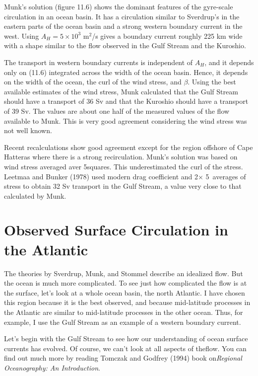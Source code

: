 Munk's solution (figure 11.6) shows the dominant features of the
gyre-scale circulation in an ocean basin. It has a circulation similar
to Sverdrup's in the eastern parts of the ocean basin and a strong
western boundary current in the west. Using $A_H = 5 \times 10^{3}$
m$^2$/s gives a boundary current roughly 225 km wide with a shape
similar to the flow observed in the Gulf Stream and the
Kuroshio.

The transport in western boundary currents is independent of $A_H$, and it depends only on
(11.6) integrated across the width of the ocean basin. Hence, it
depends on the width of the ocean, the curl of the wind
stress, and $\beta$. Using the best
available estimates of the wind stress, Munk calculated that the Gulf
Stream
should have a transport of 36 Sv and that the
Kuroshio should have a transport of 39
Sv. The values are about one half of the measured values of the flow
available to Munk. This is very good agreement considering the wind
stress was not well known.

Recent recalculations show good agreement except for the region
offshore of Cape Hatteras where there is a strong
recirculation. Munk's solution was based on wind stress averaged aver 5\degrees squares. This underestimated the
curl of the stress. Leetmaa and Bunker (1978) used modern drag
coefficient and 2\degrees $\times$
5\degrees\ averages of stress to obtain 32 Sv transport in the Gulf
Stream, a value very close to that
calculated by Munk.

\section{Observed Surface Circulation in the Atlantic}
The theories by Sverdrup, Munk, and Stommel describe an idealized
flow. But the ocean is much more complicated. To see just how
complicated the flow is at the surface, let's look at a whole ocean
basin, the north Atlantic. I have chosen this region because it is the
best observed, and because mid-latitude processes in the Atlantic are
similar to mid-latitude processes in the other ocean. Thus, for
example, I use the Gulf Stream as an example of a western boundary
current.

Let's begin with the Gulf Stream to
see how our understanding of ocean surface currents has evolved. Of
course, we can't look at all aspects of theflow. You can find out much
more by reading Tomczak and Godfrey (1994) book on\textit{Regional
  Oceanography: An Introduction}.

